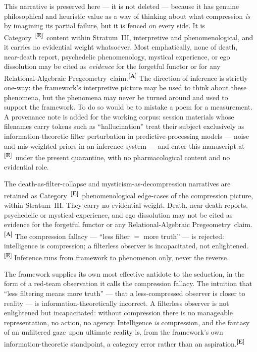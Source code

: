 \documentclass[12pt,a4paper,twoside]{article}
\theoremstyle{plain}
\theoremstyle{definition}
\theoremstyle{remark}
\newcommand{\ProjectShort}{Relational-Algebraic Pregeometry}
\newcommand{\RAP}{\ProjectShort}
\newcommand{\catmark}[1]{\textsuperscript{\textsf{\textbf{[#1]}}}}
\begin{document}
This narrative is preserved here --- it is not deleted --- because it
has genuine philosophical and heuristic value as a way of thinking about
what compression \emph{is} by imagining its partial failure, but it is
fenced on every side. It is Category~\catmark{E}\ content within
Stratum~III, interpretive and phenomenological, and it carries no
evidential weight whatsoever. Most emphatically, none of death,
near-death report, psychedelic phenomenology, mystical experience, or
ego dissolution may be cited as \emph{evidence} for the forgetful
functor or for any \RAP\ claim.\catmark{A} The direction of inference
is strictly one-way: the framework's interpretive picture may be used to
think about these phenomena, but the phenomena may never be turned
around and used to support the framework. To do so would be to mistake a
poem for a measurement. A provenance note is added for the working
corpus: session materials whose filenames carry tokens such as
``hallucination'' treat their subject exclusively as
information-theoretic filter perturbation in predictive-processing
models --- noise and mis-weighted priors in an inference system --- and
enter this manuscript at \catmark{E}\ under the present quarantine, with no
pharmacological content and no evidential role.

\begin{governancebox}
The death-as-filter-collapse and mysticism-as-decompression narratives
are retained as Category~\catmark{E}\ phenomenological edge-cases of the
compression picture, within Stratum~III. They carry no evidential
weight. Death, near-death reports, psychedelic or mystical experience,
and ego dissolution may not be cited as evidence for the forgetful
functor or any \RAP\ claim.\catmark{A} The compression fallacy ---
``less filter $=$ more truth'' --- is rejected: intelligence is
compression; a filterless observer is incapacitated, not
enlightened.\catmark{E} Inference runs from framework to phenomenon
only, never the reverse.
\end{governancebox}

The framework supplies its own most effective antidote to the seduction,
in the form of a red-team observation it calls the compression fallacy.
The intuition that ``less filtering means more truth'' --- that a
less-compressed observer is closer to reality --- is
information-theoretically incorrect. A filterless observer is not
enlightened but incapacitated: without compression there is no
manageable representation, no action, no agency. Intelligence \emph{is}
compression, and the fantasy of an unfiltered gaze upon ultimate reality
is, from the framework's own information-theoretic standpoint, a
category error rather than an aspiration.\catmark{E}
\end{document}
